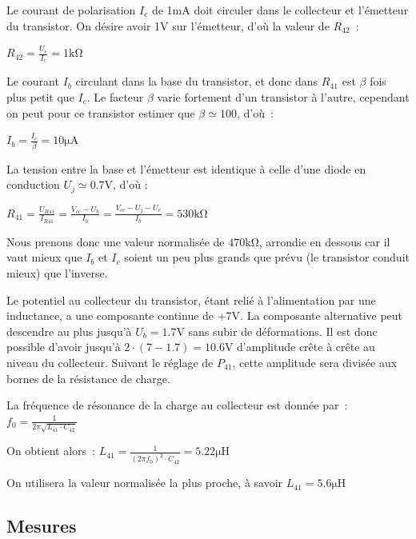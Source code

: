 \documentclass{article}
\begin{document}
Le courant de polarisation $I_c$ de 1mA doit circuler dans le collecteur et l'émetteur du transistor. On désire avoir 1V sur l'émetteur, d'où la valeur de $R_{42}$~:
\begin{center}
$R_{42} = \frac{U_e}{I_c} = 1\mathrm{k\Omega}$
\end{center}

Le courant $I_b$ circulant dans la base du transistor, et donc dans $R_{41}$ est $\beta$ fois plus petit que $I_c$.
Le facteur $\beta$ varie fortement d'un transistor à l'autre, cependant on peut pour ce transistor estimer que $\beta \simeq 100$, d'où~:
\begin{center}
$I_b = \frac{I_c}{\beta} = 10\mathrm{\mu A}$
\end{center}

La tension entre la base et l'émetteur est identique à celle d'une diode en conduction $U_j \simeq 0.7$V, d'où :
\begin{center}
$R_{41} = \frac{U_{R41}}{I_{R41}} = \frac{V_{cc} - U_b}{I_b} = \frac{V_{cc} - U_j - U_e}{I_b} = 530\mathrm{k\Omega}$
\end{center}

Nous prenons donc une valeur normalisée de $470\mathrm{k\Omega}$, arrondie en dessous car il vaut mieux que $I_b$ et $I_c$ soient un peu plus grands que prévu (le transistor conduit mieux) que l'inverse.




Le potentiel au collecteur du transistor, étant relié à l'alimentation par une inductance, a une composante continue de +7V.
La composante alternative peut descendre au plus jusqu'à ${U_b = 1.7\mathrm{V}}$ sans subir de déformations. Il est donc possible d'avoir jusqu'à ${2\cdot(7-1.7)=10.6\mathrm{V}}$ d'amplitude crête à crête au niveau du collecteur.
Suivant le réglage de $P_{41}$, cette amplitude sera divisée aux bornes de la résistance de charge.


La fréquence de résonance de la charge au collecteur est donnée par~: $f_0 = \frac{1}{2\pi \sqrt{L_{41} \cdot C_{42}}}$

On obtient alors~: $L_{41} = \frac{1}{(2\pi f_0)^2 \cdot C_{42}} = 5.22 \mathrm{\mu H}$

On utilisera la valeur normalisée la plus proche, à savoir $L_{41} = 5.6 \mathrm{\mu H}$

\subsection{Mesures}
\end{document}
